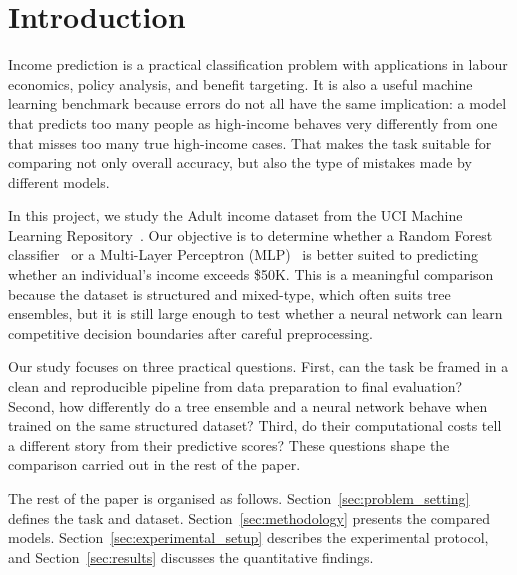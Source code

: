 \section{Introduction}

Income prediction is a practical classification problem with applications in labour economics, policy analysis, and benefit targeting. It is also a useful machine learning benchmark because errors do not all have the same implication: a model that predicts too many people as high-income behaves very differently from one that misses too many true high-income cases. That makes the task suitable for comparing not only overall accuracy, but also the type of mistakes made by different models.

In this project, we study the Adult income dataset from the UCI Machine Learning Repository~\cite{kohavi1996adult,uciadult}. Our objective is to determine whether a Random Forest classifier~\cite{breiman2001randomforest} or a Multi-Layer Perceptron (MLP)~\cite{rumelhart1986backprop,goodfellow2016deep} is better suited to predicting whether an individual's income exceeds \$50K. This is a meaningful comparison because the dataset is structured and mixed-type, which often suits tree ensembles, but it is still large enough to test whether a neural network can learn competitive decision boundaries after careful preprocessing.

Our study focuses on three practical questions. First, can the task be framed in a clean and reproducible pipeline from data preparation to final evaluation? Second, how differently do a tree ensemble and a neural network behave when trained on the same structured dataset? Third, do their computational costs tell a different story from their predictive scores? These questions shape the comparison carried out in the rest of the paper.

The rest of the paper is organised as follows. Section~\ref{sec:problem_setting} defines the task and dataset. Section~\ref{sec:methodology} presents the compared models. Section~\ref{sec:experimental_setup} describes the experimental protocol, and Section~\ref{sec:results} discusses the quantitative findings.
